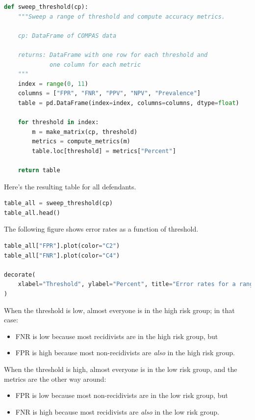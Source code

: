 \begin{lstlisting}[language=Python,style=source]
def sweep_threshold(cp):
    """Sweep a range of threshold and compute accuracy metrics.

    cp: DataFrame of COMPAS data

    returns: DataFrame with one row for each threshold and
             one column for each metric
    """
    index = range(0, 11)
    columns = ["FPR", "FNR", "PPV", "NPV", "Prevalence"]
    table = pd.DataFrame(index=index, columns=columns, dtype=float)

    for threshold in index:
        m = make_matrix(cp, threshold)
        metrics = compute_metrics(m)
        table.loc[threshold] = metrics["Percent"]

    return table
\end{lstlisting}

Here's the resulting table for all defendants.

\begin{lstlisting}[language=Python,style=source]
table_all = sweep_threshold(cp)
table_all.head()
\end{lstlisting}

The following figure shows error rates as a function of threshold.

\begin{lstlisting}[language=Python,style=source]
table_all["FPR"].plot(color="C2")
table_all["FNR"].plot(color="C4")

decorate(
    xlabel="Threshold", ylabel="Percent", title="Error rates for a range of thresholds"
)
\end{lstlisting}

When the threshold is low, almost everyone is in the high risk group; in
that case:

\begin{itemize}
\item
  FNR is low because most recidivists are in the high risk group, but
\item
  FPR is high because most non-recidivists are \emph{also} in the high
  risk group.
\end{itemize}

When the threshold is high, almost everyone is in the low risk group,
and the metrics are the other way around:

\begin{itemize}
\item
  FPR is low because most non-recidivists are in the low risk group, but
\item
  FNR is high because most recidivists are \emph{also} in the low risk
  group.
\end{itemize}

